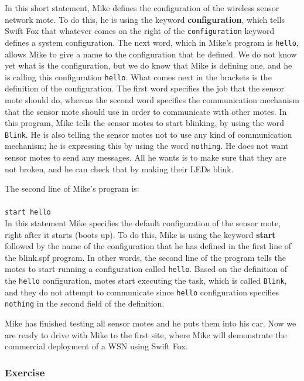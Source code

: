 In this short statement, Mike defines the configuration of the 
wireless sensor network mote. To do this, he is using the keyword
\textbf{configuration}, which tells Swift Fox that whatever comes on the
right of the \texttt{configuration} keyword defines a system configuration.
The next word, which in Mike's program is \texttt{hello}, allows Mike to
give a name to the configuration that he defined. We do not know yet what
is the configuration, but we do know that Mike is defining one, and he is
calling this configuration \texttt{hello}. What comes next in the brackets 
is the definition of the configuration. The first word specifies the job
that the sensor mote should do, whereas the second word specifies the
communication mechanism that the sensor mote should use in order to
communicate with other motes. In this program, Mike tells the sensor motes 
to start blinking, by using the word \texttt{Blink}. He is also telling
the sensor motes not to use any kind of communication mechanism; he is
expressing this by using the word \texttt{nothing}. He does not want sensor
motes to send any messages. All he wants is to make sure that they are not 
broken, and he can check that by making their LEDs blink.

The second line of Mike's program is:					\\
\\
\texttt{start hello}							\\

In this statement Mike specifies the default configuration of the sensor
mote, right after it starts (boots up). To do this, Mike is using the
keyword \textbf{start} followed by the name of the configuration that he
has defined in the first line of the blink.spf program. In other words, the
second line of the program tells the motes to start running a configuration
called \texttt{hello}. Based on the definition of the \texttt{hello}
configuration, motes start executing the task, which is called
\texttt{Blink}, and they do not attempt to communicate since \texttt{hello}
configuration specifies \texttt{nothing} in the second field of the
definition.

Mike has finished testing all sensor motes and he puts them into his car.
Now we are ready to drive with Mike to the first site, where Mike will
demonstrate the commercial deployment of a WSN using Swift Fox. 

\vspace{\fill}

\subsubsection{Exercise}


